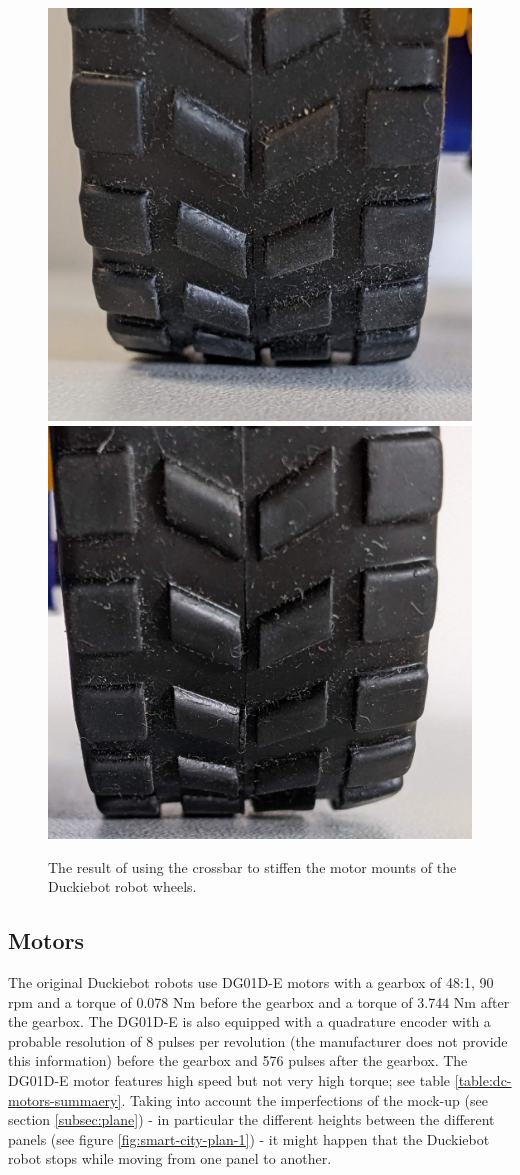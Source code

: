 \documentclass[conference]{IEEEtran}
\begin{document}
\begin{figure}[ht!]
    \centering
    \includegraphics[width=.475\columnwidth]{wheel-contact-1.jpg}
    \includegraphics[width=.475\columnwidth]{wheel-contact-2.jpg}
    \caption{The result of using the crossbar to stiffen the motor mounts of the Duckiebot robot wheels.}
    \label{fig:wheel-contact}
\end{figure}

\subsection{Motors}
The original Duckiebot robots use DG01D-E motors with a gearbox of 48:1, 90 rpm and a torque of 0.078 Nm before the gearbox and a torque of 3.744 Nm after the gearbox.
The DG01D-E is also equipped with a quadrature encoder with a probable resolution of 8 pulses per revolution (the manufacturer does not provide this information) before the gearbox and 576 pulses after the gearbox. The DG01D-E motor features high speed but not very high torque; see table \ref{table:dc-motors-summaery}. Taking into account the imperfections of the mock-up (see section \ref{subsec:plane}) - in particular the different heights between the different panels (see figure \ref{fig:smart-city-plan-1}) - it might happen that the Duckiebot robot stops while moving from one panel to another.
\end{document}

